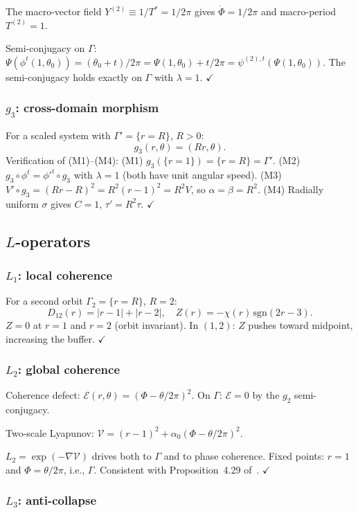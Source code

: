 \documentclass[reqno]{amsart}
\numberwithin{equation}{section}
\theoremstyle{plain}
\theoremstyle{definition}
\theoremstyle{remark}
\newcommand{\Orb}{\Gamma}
\newcommand{\abs}[1]{\left|#1\right|}
\begin{document}
The macro-vector field $Y^{(2)}\equiv 1/T^*=1/2\pi$ gives
$\dot\Phi=1/2\pi$ and macro-period $T^{(2)}=1$.

Semi-conjugacy on $\Orb$: $\Psi(\phi^t(1,\theta_0))=(\theta_0+t)/2\pi
=\Psi(1,\theta_0)+t/2\pi=\psi^{(2),t}(\Psi(1,\theta_0))$.
The semi-conjugacy holds exactly on $\Orb$ with $\lambda=1$. $\checkmark$

\subsubsection{$g_3$: cross-domain morphism}

For a scaled system with $\Orb'=\{r=R\}$, $R>0$:
\[
  g_3(r,\theta) = (Rr,\theta).
\]
Verification of (M1)--(M4):
(M1) $g_3(\{r=1\})=\{r=R\}=\Orb'$.
(M2) $g_3\circ\phi^t=\phi'^t\circ g_3$ with $\lambda=1$ (both
     have unit angular speed).
(M3) $V'\circ g_3=(Rr-R)^2=R^2(r-1)^2=R^2 V$, so $\alpha=\beta=R^2$.
(M4) Radially uniform $\sigma$ gives $C=1$, $\tau'=R^2\tau$. $\checkmark$

\subsection{\texorpdfstring{$L$}{L}-operators}

\subsubsection{$L_1$: local coherence}

For a second orbit $\Orb_2=\{r=R\}$, $R=2$:
\[
  D_{12}(r) = \abs{r-1} + \abs{r-2},\quad
  Z(r) = -\chi(r)\,\mathrm{sgn}(2r-3).
\]
$Z=0$ at $r=1$ and $r=2$ (orbit invariant). In $(1,2)$: $Z$
pushes toward midpoint, increasing the buffer. $\checkmark$

\subsubsection{$L_2$: global coherence}

Coherence defect: $\mathcal{E}(r,\theta)=(\Phi-\theta/2\pi)^2$.
On $\Orb$: $\mathcal{E}=0$ by the $g_2$ semi-conjugacy.

Two-scale Lyapunov: $\mathcal{V}=(r-1)^2+\alpha_0(\Phi-\theta/2\pi)^2$.

$L_2=\exp(-\nabla\mathcal{V})$ drives both to $\Orb$ and to phase
coherence. Fixed points: $r=1$ and $\Phi=\theta/2\pi$, i.e., $\Orb$.
Consistent with Proposition~4.29 of~\cite{Paper1}. $\checkmark$

\subsubsection{$L_3$: anti-collapse}
\end{document}
